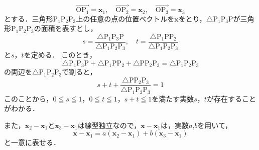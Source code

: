 \begin{tproof}
  \[
    \overrightarrow{\mathrm{OP_1}}=\bm{x}_1,\quad \overrightarrow{\mathrm{OP_2}}=\bm{x}_2,\quad \overrightarrow{\mathrm{OP_3}}=\bm{x}_3
  \]
  とする．三角形$\mathrm{P}_1 \mathrm{P}_2 \mathrm{P}_3$上の任意の点の位置ベクトルを$\bm{x}$をとり，$\triangle \mathrm{P}_1 \mathrm{P}_3 \mathrm{P}$が三角形$\mathrm{P}_1 \mathrm{P}_2 \mathrm{P}_3$の面積を表すとし，
  \[
    s = \frac{ \triangle \mathrm{P}_1 \mathrm{P}_3 \mathrm{P}} { \triangle \mathrm{P}_1 \mathrm{P}_2 \mathrm{P}_3},\quad t = \frac{ \triangle\mathrm{P}_1 \mathrm{P} \mathrm{P}_2} { \triangle\mathrm{P}_1 \mathrm{P}_2 \mathrm{P}_3}
  \]
  と$s$，$t$を定める．
  このとき，
  \[
    \triangle \mathrm{P}_1 \mathrm{P}_3 \mathrm{P} +\triangle\mathrm{P}_1 \mathrm{P} \mathrm{P}_2+ \triangle \mathrm{P} \mathrm{P}_2 \mathrm{P}_3 = \triangle \mathrm{P}_1 \mathrm{P}_2 \mathrm{P}_3
  \]
  の両辺を$ \triangle \mathrm{P}_1 \mathrm{P}_2 \mathrm{P}_3$で割ると，
  \[
    s+t + \frac{ \triangle \mathrm{P} \mathrm{P}_2 \mathrm{P}_3} { \triangle \mathrm{P}_1 \mathrm{P}_2 \mathrm{P}_3} = 1
  \]
  このことから，$ 0 \leqq s \leqq 1$，$0 \leqq t \leqq 1$，$s+t \leqq 1$を満たす実数$s$，$t$が存在することがわかる．

  また，$\bm{x}_2 -\bm{x}_1$と$\bm{x}_3 -\bm{x}_1$は線型独立なので，$\bm{x}-\bm{x}_1$は，実数$a$,$b$を用いて，
  \[
    \bm{x} - \bm{x}_1 = a(\bm{x}_2 - \bm{x}_1) + b(\bm{x}_3 - \bm{x}_1)
  \]
  と一意に表せる．


\end{tproof}
